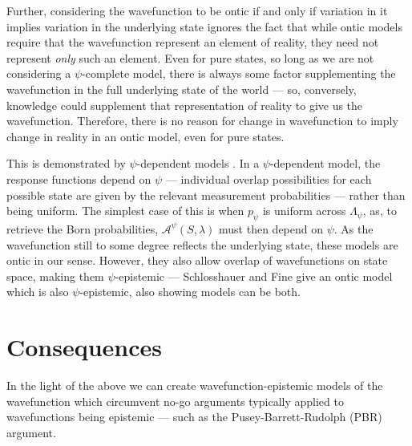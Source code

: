 \documentclass[superscriptaddress, floatfix,nofootinbib,12pt]{revtex4-2}
\begin{document}
Further, considering the wavefunction to be ontic if and only if variation in it implies variation in the underlying state ignores the fact that while ontic models require that the wavefunction represent an element of reality, they need not represent {\it only} such an element. Even for pure states, so long as we are not considering a $\psi$-complete model, there is always some factor supplementing the wavefunction in the full underlying state of the world --- so, conversely, knowledge could supplement that representation of reality to give us the wavefunction. Therefore, there is no reason for change in wavefunction to imply change in reality in an ontic model, even for pure states.

This is demonstrated by $\psi$-dependent models \cite{Schlosshauer2012Implications}. In a $\psi$-dependent model, the response functions depend on $\psi$ --- individual overlap possibilities for each possible state are given by the relevant measurement probabilities --- rather than being uniform. The simplest case of this is when $p_\psi$ is uniform across $\Lambda_\psi$, as, to retrieve the Born probabilities, $\mathcal{A}^\psi(S,\lambda)$ must then depend on $\psi$. As the wavefunction still to some degree reflects the underlying state, these models are ontic in our sense. However, they also allow overlap of wavefunctions on state space, making them $\psi$-epistemic --- Schlosshauer and Fine give an ontic model which is also $\psi$-epistemic, also showing models can be both.

\section{Consequences}

In the light of the above we can create wavefunction-epistemic models of the wavefunction which circumvent no-go arguments typically applied to wavefunctions being epistemic --- such as the Pusey-Barrett-Rudolph (PBR) argument.
\end{document}

